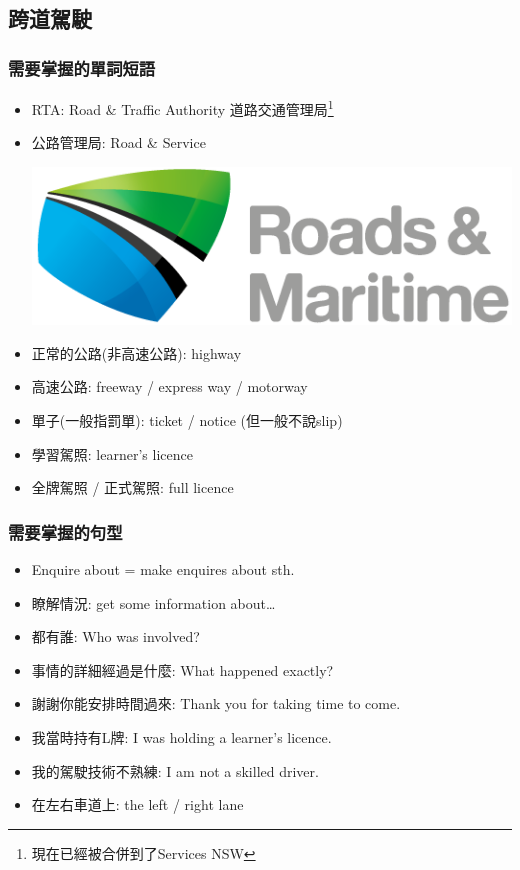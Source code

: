 \subsection{跨道駕駛}
\subsubsection*{需要掌握的單詞短語}
\begin{itemize}
  \itemsep0em
  \item RTA: Road \& Traffic Authority 道路交通管理局\footnote{現在已經被合併到了Services NSW}
  \item 公路管理局: Road \&  Service
  \begin{center}
    \includegraphics[scale=.5]{pics/rms}
  \end{center}
  \item 正常的公路(非高速公路): highway
  \item 高速公路: freeway / express way / motorway
  \item 單子(一般指罰單): ticket / notice (但一般不說slip)
  \item 學習駕照: learner’s licence
  \item 全牌駕照 / 正式駕照: full licence
\end{itemize}

\subsubsection*{需要掌握的句型}
\begin{multicols}{2}
\begin{itemize}
  \itemsep0em
  \item Enquire about = make enquires about sth.
  \item 瞭解情況: get some information about…
  \item {}都有誰: Who was involved?
  \item 事情的詳細經過是什麼: What happened exactly?
  \item 謝謝你能安排時間過來: Thank you for taking time to come.
  \item 我當時持有L牌: I was holding a learner’s licence.
  \item 我的駕駛技術不熟練: I am not a skilled driver.
  \item 在左右車道上:  the left / right lane
\end{itemize}
\end{multicols}

